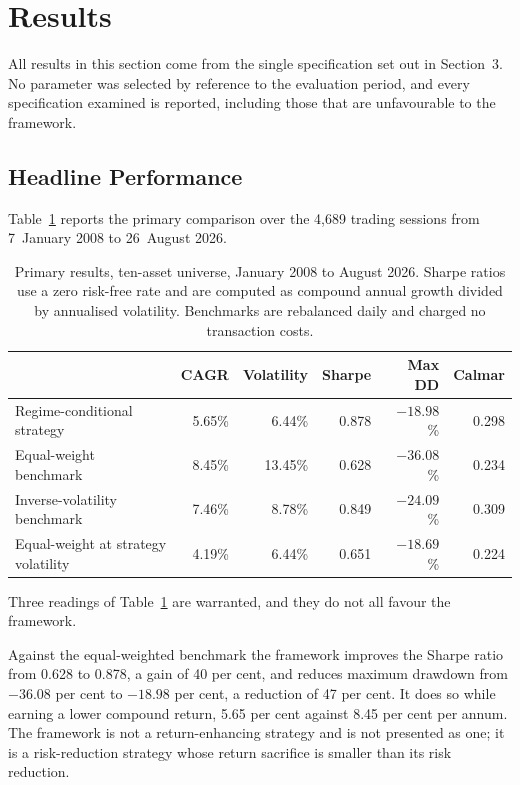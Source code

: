 \section{Results}
\label{sec:results}

All results in this section come from the single specification set out in Section~3.
No parameter was selected by reference to the evaluation period, and every
specification examined is reported, including those that are unfavourable to the
framework.

\subsection{Headline Performance}

Table~\ref{tab:main} reports the primary comparison over the 4{,}689 trading sessions from
7~January 2008 to 26~August 2026.

\begin{table}[!ht]
\centering
\caption{Primary results, ten-asset universe, January 2008 to August 2026. Sharpe
ratios use a zero risk-free rate and are computed as compound annual growth divided by
annualised volatility. Benchmarks are rebalanced daily and charged no transaction costs.}
\label{tab:main}
\small
\begin{tabular}{p{4.4cm}rrrrr}
\hline
& \textbf{CAGR} & \textbf{Volatility} & \textbf{Sharpe} & \textbf{Max DD} & \textbf{Calmar} \\
\hline
Regime-conditional strategy & 5.65\% & 6.44\% & 0.878 & $-18.98$\% & 0.298 \\
Equal-weight benchmark & 8.45\% & 13.45\% & 0.628 & $-36.08$\% & 0.234 \\
Inverse-volatility benchmark & 7.46\% & 8.78\% & 0.849 & $-24.09$\% & 0.309 \\
Equal-weight at strategy volatility & 4.19\% & 6.44\% & 0.651 & $-18.69$\% & 0.224 \\
\hline
\end{tabular}
\end{table}

Three readings of Table~\ref{tab:main} are warranted, and they do not all favour the framework.

Against the equal-weighted benchmark the framework improves the Sharpe ratio from 0.628
to 0.878, a gain of 40 per cent, and reduces maximum drawdown from $-36.08$ per cent to
$-18.98$ per cent, a reduction of 47 per cent. It does so while earning a lower
compound return, 5.65 per cent against 8.45 per cent per annum. The framework is not a
return-enhancing strategy and is not presented as one; it is a risk-reduction strategy
whose return sacrifice is smaller than its risk reduction.


